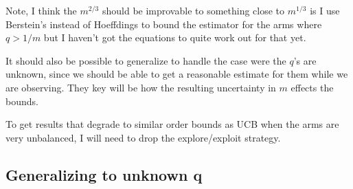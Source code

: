 \documentclass{article}
\theoremstyle{plain}
\theoremstyle{definition}
\begin{document}
Note, I think the $m^{2/3}$ should be improvable to something close to $m^{1/3}$ is I use Berstein's instead of Hoeffdings to bound the estimator for the arms where $q > 1/m$ but I haven't got the equations to quite work out for that yet. 

It should also be possible to generalize to handle the case were the $q$'s are unknown, since we should be able to get a reasonable estimate for them while we are observing. They key will be how the resulting uncertainty in $m$ effects the bounds. 

To get results that degrade to similar order bounds as UCB when the arms are very unbalanced, I will need to drop the explore/exploit strategy. 


\subsection{Generalizing to unknown q}
\end{document}
